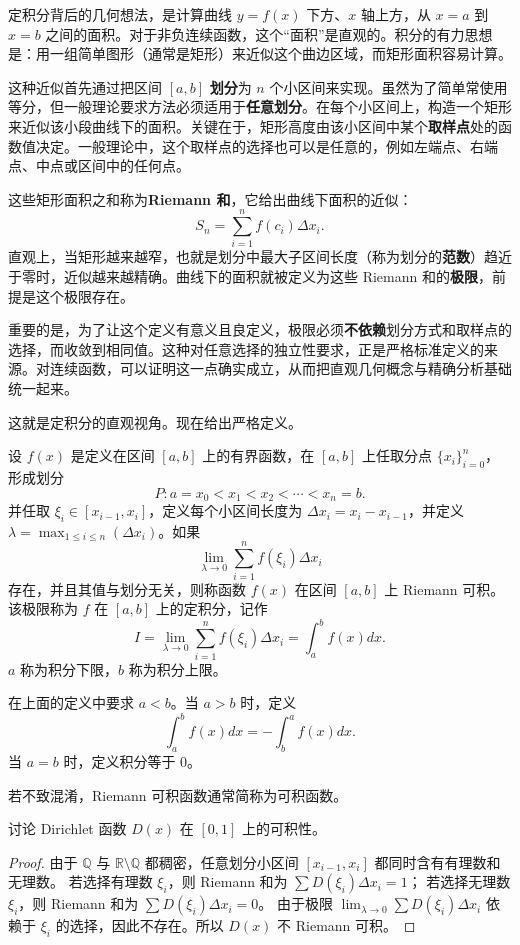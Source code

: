 定积分背后的几何想法，是计算曲线 $y=f(x)$ 下方、$x$ 轴上方，从 $x=a$ 到 $x=b$ 之间的面积。对于非负连续函数，这个“面积”是直观的。积分的有力思想是：用一组简单图形（通常是矩形）来近似这个曲边区域，而矩形面积容易计算。

这种近似首先通过把区间 $[a,b]$ \textbf{划分}为 $n$ 个小区间来实现。虽然为了简单常使用等分，但一般理论要求方法必须适用于\textbf{任意划分}。在每个小区间上，构造一个矩形来近似该小段曲线下的面积。关键在于，矩形高度由该小区间中某个\textbf{取样点}处的函数值决定。一般理论中，这个取样点的选择也可以是任意的，例如左端点、右端点、中点或区间中的任何点。

这些矩形面积之和称为\textbf{Riemann 和}，它给出曲线下面积的近似：
\[
S_n=\sum_{i=1}^{n}f(c_i)\Delta x_i.
\]
直观上，当矩形越来越窄，也就是划分中最大子区间长度（称为划分的\textbf{范数}）趋近于零时，近似越来越精确。曲线下的面积就被定义为这些 Riemann 和的\textbf{极限}，前提是这个极限存在。

重要的是，为了让这个定义有意义且良定义，极限必须\textbf{不依赖}划分方式和取样点的选择，而收敛到相同值。这种对任意选择的独立性要求，正是严格标准定义的来源。对连续函数，可以证明这一点确实成立，从而把直观几何概念与精确分析基础统一起来。

这就是定积分的直观视角。现在给出严格定义。

\begin{definition}
设 $f(x)$ 是定义在区间 $[a,b]$ 上的有界函数，在 $[a,b]$ 上任取分点 $\{x_i\}_{i=0}^{n}$，形成划分
\[
P:a=x_0<x_1<x_2<\cdots<x_n=b.
\]
并任取 $\xi_i\in[x_{i-1},x_i]$，定义每个小区间长度为 $\Delta x_i=x_i-x_{i-1}$，并定义 $\lambda=\max_{1\le i\le n}(\Delta x_i)$。如果
\[
\lim_{\lambda\to 0}\sum_{i=1}^{n}f(\xi_i)\Delta x_i
\]
存在，并且其值与划分无关，则称函数 $f(x)$ 在区间 $[a,b]$ 上 Riemann 可积。该极限称为 $f$ 在 $[a,b]$ 上的定积分，记作
\[
I=\lim_{\lambda\to 0}\sum_{i=1}^{n}f(\xi_i)\Delta x_i=\int_a^b f(x)dx.
\]
$a$ 称为积分下限，$b$ 称为积分上限。
\end{definition}

在上面的定义中要求 $a<b$。当 $a>b$ 时，定义
\[
\int_a^b f(x)dx=-\int_b^a f(x)dx.
\]
当 $a=b$ 时，定义积分等于 $0$。

若不致混淆，Riemann 可积函数通常简称为可积函数。

\begin{example}
讨论 Dirichlet 函数 $D(x)$ 在 $[0,1]$ 上的可积性。
\begin{proof}
由于 $\mathbb{Q}$ 与 $\mathbb{R}\setminus \mathbb{Q}$ 都稠密，任意划分小区间 $[x_{i-1},x_i]$ 都同时含有有理数和无理数。
若选择有理数 $\xi_i$，则 Riemann 和为 $\sum D(\xi_i)\Delta x_i=1$；
若选择无理数 $\xi_i$，则 Riemann 和为 $\sum D(\xi_i)\Delta x_i=0$。
由于极限 $\lim_{\lambda\to 0}\sum D(\xi_i)\Delta x_i$ 依赖于 $\xi_i$ 的选择，因此不存在。所以 $D(x)$ 不 Riemann 可积。
\end{proof}
\end{example}

